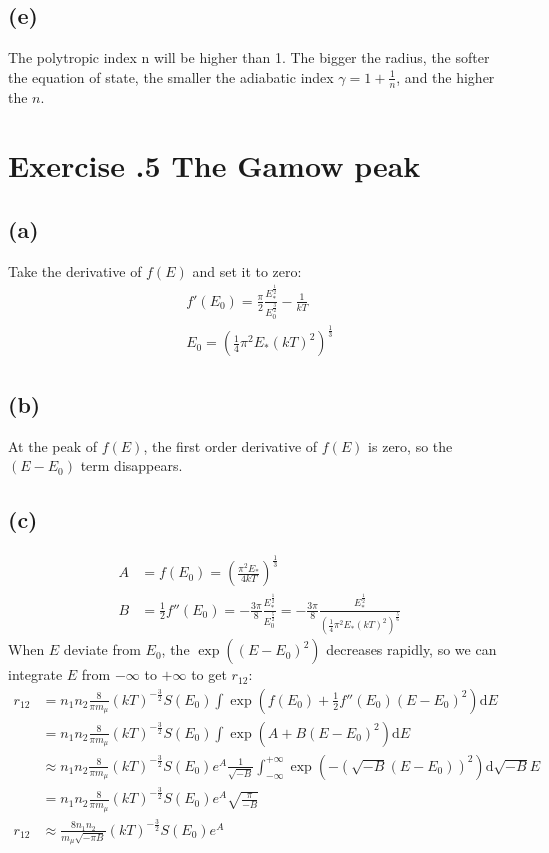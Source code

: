 \documentclass[a4paper,12pt]{article}
\renewcommand{\d}{\mathrm{d}}
\begin{document}
\subsection*{(e)}
The polytropic index n will be higher than 1. The bigger the radius, the softer the equation of state, 
the smaller the adiabatic index $\gamma = 1 + \frac{1}{n}$, and the higher the $n$.


\section*{\textbf{Exercise \uppercase\expandafter{}.5 The Gamow peak}}
\subsection*{(a)}
Take the derivative of $f(E)$ and set it to zero:
\begin{align*}
    f'(E_0) = \frac{\pi}{2} \frac{E_*^{\frac{1}{2}}}{E_0^{\frac{3}{2}}} - \frac{1}{kT}\\
    E_0 = (\frac{1}{4} \pi^2 E_* (kT)^2)^{\frac{1}{3}}
\end{align*}

\subsection*{(b)}
At the peak of $f(E)$, the first order derivative of $f(E)$ is zero, so the $(E - E_0)$ term disappears.

\subsection*{(c)}
\begin{align*}
    A &= f(E_0) = (\frac{\pi^2 E_*}{4kT})^{\frac{1}{3}} \\
    B &= \frac{1}{2} f''(E_0) = -\frac{3\pi}{8} \frac{E_*^{\frac{1}{2}}}{E_0^{\frac{5}{2}}}
     = -\frac{3\pi}{8} \frac{E_*^{\frac{1}{2}}}{(\frac{1}{4} \pi^2 E_* (kT)^2)^{\frac{5}{6}}}
\end{align*}
When $E$ deviate from $E_0$, the $\exp((E-E_0)^2)$ decreases rapidly, so we can integrate $E$ from $-\infty$ to $+\infty$ to get $r_{12}$:
\begin{align*}
    r_{12} &= n_1 n_2 \frac{8}{\pi m_\mu} (kT)^{-\frac{3}{2}} S(E_0) \int \exp(f(E_0) + \frac{1}{2} f''(E_0) (E-E_0)^2) \d E\\
    &= n_1 n_2 \frac{8}{\pi m_\mu} (kT)^{-\frac{3}{2}} S(E_0) \int \exp(A + B (E-E_0)^2) \d E\\
    &\approx n_1 n_2 \frac{8}{\pi m_\mu} (kT)^{-\frac{3}{2}} S(E_0) e^A \frac{1}{\sqrt{-B}} \int_{-\infty}^{+\infty} \exp(- (\sqrt{-B}(E-E_0))^2) \d \sqrt{-B} E\\
    &= n_1 n_2 \frac{8}{\pi m_\mu} (kT)^{-\frac{3}{2}} S(E_0) e^A \sqrt{\frac{\pi}{-B}} \\
    r_{12}&\approx \frac{8n_1 n_2}{m_\mu \sqrt{- \pi B}} (kT)^{-\frac{3}{2}} S(E_0) e^A
\end{align*}
\end{document}
